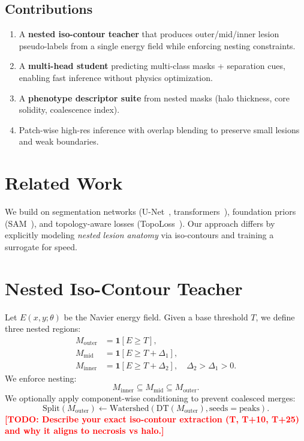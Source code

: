 \documentclass[journal]{IEEEtran}
\newcommand{\TODO}[1]{\textcolor{red}{\textbf{[TODO: #1]}}}
\begin{document}
\subsection{Contributions}
\begin{enumerate}
\item A \textbf{nested iso-contour teacher} that produces outer/mid/inner lesion pseudo-labels from a single energy field while enforcing nesting constraints.
\item A \textbf{multi-head student} predicting multi-class masks + separation cues, enabling fast inference without physics optimization.
\item A \textbf{phenotype descriptor suite} from nested masks (halo thickness, core solidity, coalescence index).
\item Patch-wise high-res inference with overlap blending to preserve small lesions and weak boundaries.
\end{enumerate}

\section{Related Work}
We build on segmentation networks (U-Net~\cite{ronneberger2015unet}, transformers~\cite{xie2021segformer,cheng2022mask2former}), foundation priors (SAM~\cite{kirillov2023sam}), and topology-aware losses (TopoLoss~\cite{hu2019topoloss}).
Our approach differs by explicitly modeling \emph{nested lesion anatomy} via iso-contours and training a surrogate for speed.

\section{Nested Iso-Contour Teacher}
Let $E(x,y;\theta)$ be the Navier energy field.
Given a base threshold $T$, we define three nested regions:
\begin{align}
M_{\text{outer}} &= \mathbf{1}[E \ge T],\\
M_{\text{mid}}   &= \mathbf{1}[E \ge T+\Delta_1],\\
M_{\text{inner}} &= \mathbf{1}[E \ge T+\Delta_2],\quad \Delta_2>\Delta_1>0.
\end{align}
We enforce nesting:
\begin{equation}
M_{\text{inner}} \subseteq M_{\text{mid}} \subseteq M_{\text{outer}}.
\end{equation}
We optionally apply component-wise conditioning to prevent coalesced merges:
\begin{equation}
\text{Split}(M_{\text{outer}}) \leftarrow \mathrm{Watershed}(\mathrm{DT}(M_{\text{outer}}), \text{seeds}=\mathrm{peaks}).
\end{equation}
\TODO{Describe your exact iso-contour extraction (T, T+10, T+25) and why it aligns to necrosis vs halo.}
\end{document}
